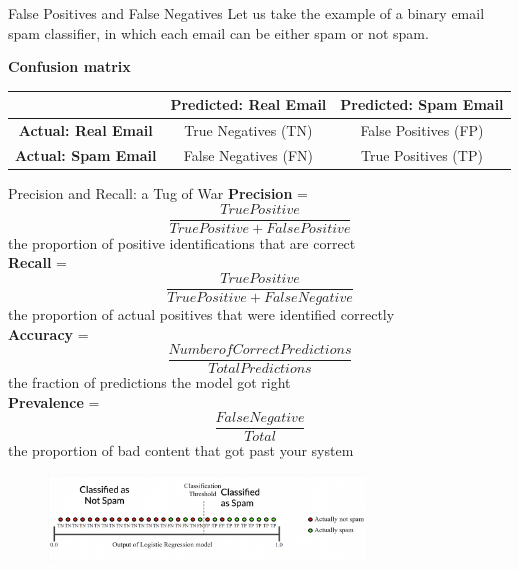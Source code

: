 \documentclass[nobackground,dvipsnames,table,aspectratio=169]{beamer}
\begin{document}
\begin{frame}{False Positives and False Negatives}
    Let us take the example of a binary email spam classifier, in which each email can be either spam or not spam.
    
    \textbf{Confusion matrix}
    \begin{tabularx}{0.8\textwidth}{|c|c|c|}%
        \hline
        & \textbf{Predicted: Real Email} & \textbf{Predicted: Spam Email} \\
        \hline
        \textbf{Actual: Real Email} & True Negatives (TN) & False Positives (FP)\\
        \hline
        \textbf{Actual: Spam Email} & False Negatives (FN) & True Positives (TP) \\
        \hline
    \end{tabularx}
\end{frame}

\begin{frame}{Precision and Recall: a Tug of War} %
    \footnotesize
    \textbf{Precision} = $$\frac{True Positive}{True Positive + False Positive}$$ the proportion of positive identifications that are correct\\
    \textbf{Recall} = $$\frac{True Positive}{True Positive + False Negative}$$ the proportion of actual positives that were identified correctly\\
    \textbf{Accuracy} = $$\frac{Number of Correct Predictions}{Total Predictions}$$ the fraction of predictions the model got right\\
    \textbf{Prevalence} = $$\frac{False Negative}{Total}$$ the proportion of bad content that got past your system
    \begin{figure}
        \centering
        \includegraphics[width=0.75\textwidth]{spam-classification}
    \end{figure}
\end{frame}
\end{document}
